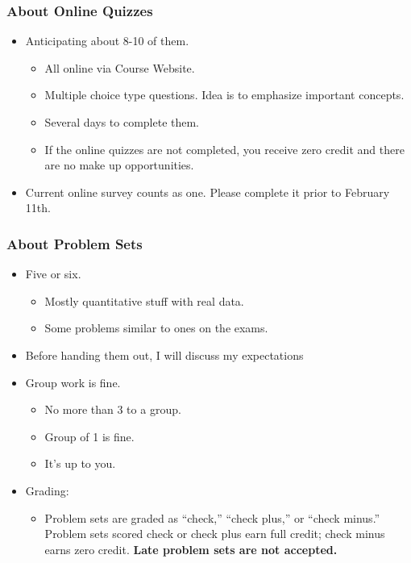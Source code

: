 \documentclass[9pt]{beamer}
\begin{document}
\begin{frame}[t]
\frametitle{About Online Quizzes}
\begin{itemize}
\item Anticipating about 8-10 of them.
\begin{itemize}
\medskip
\item All online via Course Website.
\medskip
\item Multiple choice type questions. Idea is to emphasize important concepts.
\medskip
\item Several days to complete them.
\medskip
\item If the online quizzes are not completed, you receive zero credit and there are no make up opportunities.
\end{itemize}
\bigskip
\item Current online survey counts as one. Please complete it prior to February 11th.
\bigskip
\end{itemize}
\end{frame}


\begin{frame}[t]
\frametitle{About Problem Sets}
\begin{itemize}
\item Five or six.
\begin{itemize}
\medskip
\item Mostly quantitative stuff with real data.
\medskip
\item Some problems similar to ones on the exams.
\end{itemize}
\bigskip
\item Before handing them out, I will discuss my expectations
\bigskip
\item Group work is fine.
\begin{itemize}
\medskip
\item No more than 3 to a group.
\medskip
\item Group of 1 is fine.
\medskip
\item It's up to you.
\end{itemize}
\bigskip
\item Grading:
\begin{itemize}
\medskip
\item Problem sets are graded as ``check,'' ``check plus,'' or ``check minus.'' Problem sets scored check or check plus earn full credit; check minus earns zero credit. \textbf{Late problem sets are not accepted.}
\end{itemize}
\end{itemize}
\end{frame}
\end{document}
